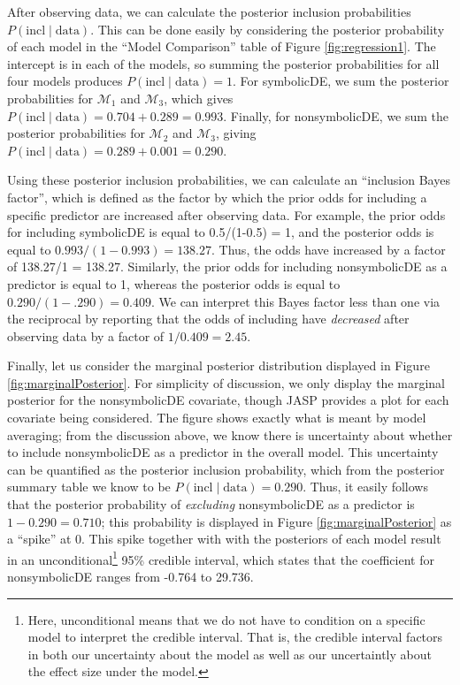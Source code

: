 \documentclass[english,,doc,floatsintext]{apa6}
\let\rmarkdownfootnote\footnote%
\def\footnote{\protect\rmarkdownfootnote}
\begin{document}
After observing data, we can calculate the posterior inclusion probabilities \(P(\text{incl}\mid \text{data})\). This can be done easily by considering the posterior probability of each model in the \enquote{Model Comparison} table of Figure \ref{fig:regression1}. The intercept is in each of the models, so summing the posterior probabilities for all four models produces \(P(\text{incl}\mid \text{data}) = 1\). For symbolicDE, we sum the posterior probabilities for \(\mathcal{M}_{1}\) and \(\mathcal{M}_{3}\), which gives \(P(\text{incl}\mid \text{data}) = 0.704 + 0.289 = 0.993\). Finally, for nonsymbolicDE, we sum the posterior probabilities for \(\mathcal{M}_{2}\) and \(\mathcal{M}_{3}\), giving \(P(\text{incl}\mid \text{data}) = 0.289 + 0.001 = 0.290\).

Using these posterior inclusion probabilities, we can calculate an \enquote{inclusion Bayes factor}, which is defined as the factor by which the prior odds for including a specific predictor are increased after observing data. For example, the prior odds for including symbolicDE is equal to 0.5/(1-0.5) = 1, and the posterior odds is equal to \(0.993/(1-0.993) = 138.27\). Thus, the odds have increased by a factor of 138.27/1 = 138.27. Similarly, the prior odds for including nonsymbolicDE as a predictor is equal to 1, whereas the posterior odds is equal to \(0.290/(1-.290) = 0.409\). We can interpret this Bayes factor less than one via the reciprocal by reporting that the odds of including have \emph{decreased} after observing data by a factor of \(1/0.409 = 2.45\).

Finally, let us consider the marginal posterior distribution displayed in Figure \ref{fig:marginalPosterior}. For simplicity of discussion, we only display the marginal posterior for the nonsymbolicDE covariate, though JASP provides a plot for each covariate being considered. The figure shows exactly what is meant by model averaging; from the discussion above, we know there is uncertainty about whether to include nonsymbolicDE as a predictor in the overall model. This uncertainty can be quantified as the posterior inclusion probability, which from the posterior summary table we know to be \(P(\text{incl}\mid \text{data}) = 0.290\). Thus, it easily follows that the posterior probability of \emph{excluding} nonsymbolicDE as a predictor is \(1-0.290 = 0.710\); this probability is displayed in Figure \ref{fig:marginalPosterior} as a \enquote{spike} at 0. This spike together with with the posteriors of each model result in an unconditional\footnote{Here, unconditional means that we do not have to condition on a specific model to interpret the credible interval. That is, the credible interval factors in both our uncertainty about the model as well as our uncertaintly about the effect size under the model.} 95\% credible interval, which states that the coefficient for nonsymbolicDE ranges from -0.764 to 29.736.
\end{document}
